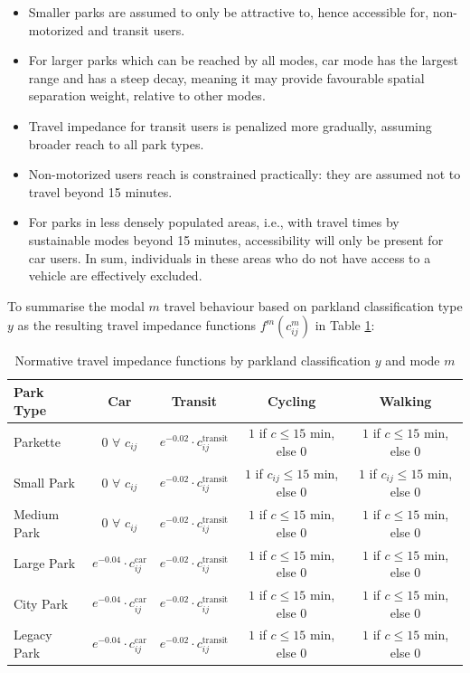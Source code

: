 \documentclass[
11pt, %
oneside, %
english, %
singlespacing, %
]{macthesis} %
\def\tightlist{}
\begin{document}
\begin{itemize}
\tightlist
\item
  Smaller parks are assumed to only be attractive to, hence accessible for, non-motorized and transit users.
\item
  For larger parks which can be reached by all modes, car mode has the largest range and has a steep decay, meaning it may provide favourable spatial separation weight, relative to other modes.
\item
  Travel impedance for transit users is penalized more gradually, assuming broader reach to all park types.
\item
  Non-motorized users reach is constrained practically: they are assumed not to travel beyond 15 minutes.
\item
  For parks in less densely populated areas, i.e., with travel times by sustainable modes beyond 15 minutes, accessibility will only be present for car users. In sum, individuals in these areas who do not have access to a vehicle are effectively excluded.
\end{itemize}

To summarise the modal \(m\) travel behaviour based on parkland classification type \(y\) as the resulting travel impedance functions \(f^m(c^m_{ij})\) in Table \ref{tab:chp3-travel-impedance-by-park-mode}:

\begin{table}[ht]
\centering
\small
\begin{tabular}{|l|c|c|c|c|}
\hline
\textbf{Park Type} & \textbf{Car} & \textbf{Transit} & \textbf{Cycling} & \textbf{Walking} \\
\hline
Parkette &
0 $\forall$ $c_{ij}$ &
$e^{-0.02} \cdot c_{ij}^{\text{transit}}$ &
$1$ if $c \leq 15$ min, else 0 &
$1$ if $c \leq 15$ min, else 0 \\
\hline
Small Park &
0 $\forall$ $c_{ij}$ &
$e^{-0.02} \cdot c_{ij}^{\text{transit}}$ &
$1$ if $c_{ij} \leq 15$ min, else 0 &
$1$ if $c_{ij} \leq 15$ min, else 0 \\
\hline
Medium Park &
0 $\forall$ $c_{ij}$ &
$e^{-0.02} \cdot c_{ij}^{\text{transit}}$ &
$1$ if $c \leq 15$ min, else 0 &
$1$ if $c \leq 15$ min, else 0 \\
\hline
Large Park &
$e^{-0.04} \cdot c_{ij}^{\text{car}}$ &
$e^{-0.02} \cdot c_{ij}^{\text{transit}}$ &
$1$ if $c \leq 15$ min, else 0 &
$1$ if $c \leq 15$ min, else 0 \\
\hline
City Park &
$e^{-0.04} \cdot c_{ij}^{\text{car}}$ &
$e^{-0.02} \cdot c_{ij}^{\text{transit}}$ &
$1$ if $c \leq 15$ min, else 0 &
$1$ if $c \leq 15$ min, else 0 \\
\hline
Legacy Park &
$e^{-0.04} \cdot c_{ij}^{\text{car}}$ &
$e^{-0.02} \cdot c_{ij}^{\text{transit}}$ &
$1$ if $c \leq 15$ min, else 0 &
$1$ if $c \leq 15$ min, else 0 \\
\hline
\end{tabular}
\caption{Normative travel impedance functions by parkland classification $y$ and mode $m$}
\label{tab:chp3-travel-impedance-by-park-mode}
\end{table}
\end{document}
